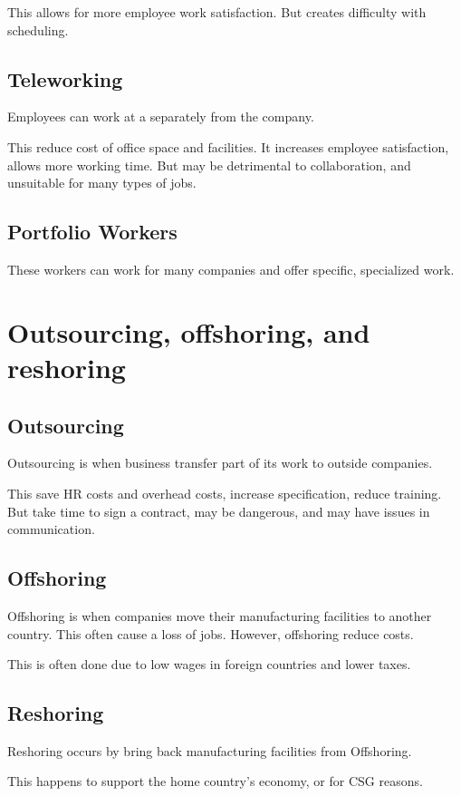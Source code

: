 \documentclass{standalone}
\begin{document}
This allows for more employee work satisfaction.
But creates difficulty with scheduling.

\subsection{Teleworking}
Employees can work at a separately from the company.

This reduce cost of office space and facilities.
It increases employee satisfaction, allows more working time.
But may be detrimental to collaboration, and unsuitable for many types of jobs.

\subsection{Portfolio Workers}
These workers can work for many companies and offer specific, specialized work.

\section{Outsourcing, offshoring, and reshoring}

\subsection{Outsourcing}
Outsourcing is when business transfer part of its work to outside companies.

This save HR costs and overhead costs, increase specification, reduce training.
But take time to sign a contract, may be dangerous, and may have issues in communication.

\subsection{Offshoring}
Offshoring is when companies move their manufacturing facilities to another country.
This often cause a loss of jobs.  
However, offshoring reduce costs.

This is often done due to low wages in foreign countries and lower taxes.

\subsection{Reshoring}
Reshoring occurs by bring back manufacturing facilities from Offshoring.

This happens to support the home country's economy, or for CSG reasons.
\end{document}
